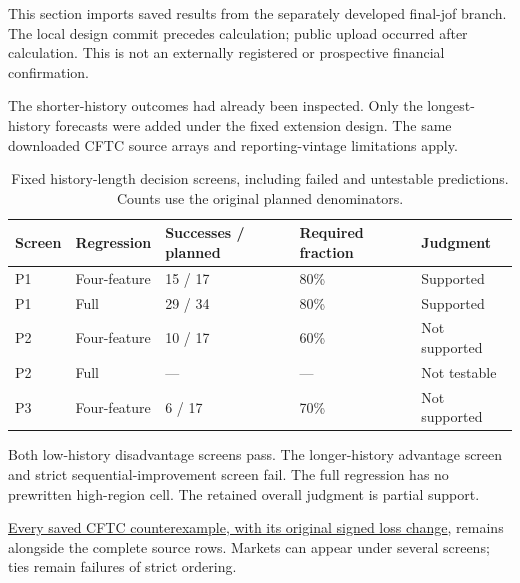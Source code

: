 \documentclass[12pt,a4paper]{article}
\begin{document}
This section imports saved results from the separately developed final-jof branch. The local design commit precedes calculation; public upload occurred after calculation. This is not an externally registered or prospective financial confirmation.

The shorter-history outcomes had already been inspected. Only the longest-history forecasts were added under the fixed extension design. The same downloaded CFTC source arrays and reporting-vintage limitations apply.

\begin{table}[htbp]\centering\small

\caption{Fixed history-length decision screens, including failed and untestable predictions. Counts use the original planned denominators.}\label{tab:submission-wp2}

\begin{tabular}{lllll}\toprule

Screen & Regression & Successes / planned & Required fraction & Judgment\\\midrule

P1 & Four-feature & 15 / 17 & 80\% & Supported\\

P1 & Full & 29 / 34 & 80\% & Supported\\

P2 & Four-feature & 10 / 17 & 60\% & Not supported\\

P2 & Full & --- & --- & Not testable\\

P3 & Four-feature & 6 / 17 & 70\% & Not supported\\

\bottomrule\end{tabular}\end{table}

Both low-history disadvantage screens pass. The longer-history advantage screen and strict sequential-improvement screen fail. The full regression has no prewritten high-region cell. The retained overall judgment is partial support.

\href{https://github.com/ByronLi0207/financial-mathematics-paper-20261020/blob/submission-final/EXTENDED_RESULTS.md#asmbi-extended-s39}{Every saved CFTC counterexample, with its original signed loss change}, remains alongside the complete source rows. Markets can appear under several screens; ties remain failures of strict ordering.

\FloatBarrier
\end{document}
